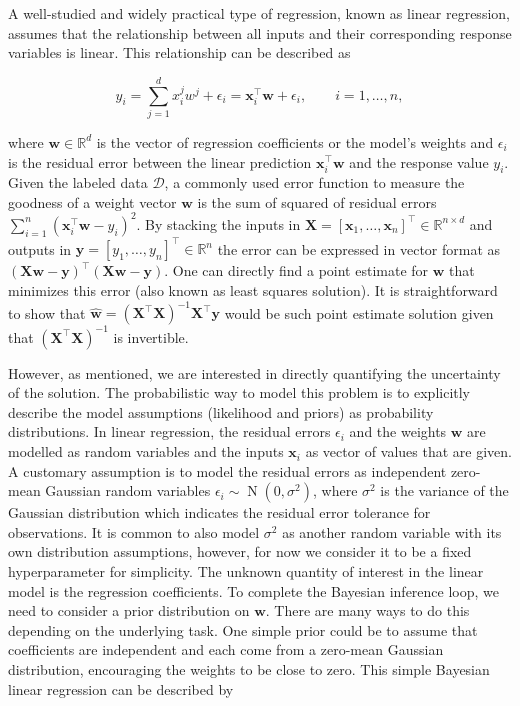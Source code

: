 \documentclass[dissertation,math,vertlayout,pdfa,colorlinks]{aaltoseries}
\newcommand{\bw}{\bm{w}}
\newcommand{\bX}{\bm{X}}
\newcommand{\by}{\bm{y}}
\newcommand{\bD}{\mathcal{D}}
\DeclareMathOperator{\normalpdf}{N}
\newcommand{\tp}{^{\top}}
\begin{document}
A well-studied and widely practical type of regression, known as linear regression, assumes that the relationship between all inputs and their corresponding response variables is linear. This relationship can be described as 

\begin{equation}\label{Eq:linear_reg_no_Bayes}
y_i= \sum_{j=1}^{d}x_{i}^{j} w^{j}+\epsilon_i=\bm{x}_i\tp\bw+\epsilon_i, \qquad i=1,\ldots,n,
\end{equation}

\noindent where $\bw \in \mathbb{R}^d$ is the vector of regression coefficients or the model's weights and $\epsilon_i$ is the residual error between the linear prediction $\bm{x}_i\tp\bw$ and the response value $y_i$. Given the labeled data $\bD$, a commonly used error function to measure the goodness of a  weight vector $\bw$ is the sum of squared of residual errors $\sum_{i=1}^n(\bm{x}_i\tp\bw- y_i)^2$. By stacking the inputs in $\bX = [\bm{x}_1,\ldots,\bm{x}_n]\tp \in \mathbb{R}^{n\times d}$ and outputs in $\by = [y_1,\ldots,y_n]\tp \in \mathbb{R}^n$ the error can be expressed in vector format as $(\bX\bw- \by)\tp(\bX\bw- \by)$. 
One can directly find a point estimate for $\bw$ that minimizes this error (also known as least squares solution). 
It is straightforward to show that $\hat{\bw} = (\bX \tp \bX)^{-1}\bX\tp \by$  would be such point estimate solution given that $(\bX \tp \bX)^{-1}$ is invertible.  

However, as mentioned, we are interested in directly quantifying the uncertainty of the solution. The probabilistic way to model this problem is to explicitly describe the model assumptions (likelihood and priors) as probability distributions. In linear regression, the residual errors $\epsilon_i$ and the weights $\bw$ are modelled as random variables and the inputs $\bm{x}_i$ as vector of values that are given. A customary assumption is to model the residual errors as independent zero-mean Gaussian random variables $\epsilon_i \sim \normalpdf(0,\sigma^2)$, where $\sigma^2$ is the variance of the Gaussian distribution which indicates the residual error tolerance for observations. It is common to also model $\sigma^2$ as another random variable with its own distribution assumptions, however, for now we consider it to be a fixed hyperparameter for simplicity. The unknown quantity of interest in the linear model is the regression coefficients. To complete the Bayesian inference loop, we need to consider a prior distribution on $\bw$. There are many ways to do this depending on the underlying task. One simple prior could be to assume that coefficients are independent and each come from a zero-mean Gaussian distribution, encouraging the weights to be close to zero. This simple Bayesian linear regression can be described by
\end{document}
